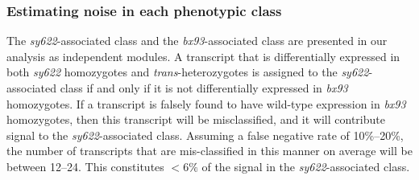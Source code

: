 \documentclass[10pt, twocolumn]{article}
\begin{document}
%
%

\subsubsection*{Estimating noise in each phenotypic class}
The \emph{sy622}-associated class and the \emph{bx93}-associated class are
presented in our analysis as independent modules. A transcript that is
differentially expressed in both \emph{sy622} homozygotes and
\emph{trans}-heterozygotes is assigned to the \emph{sy622}-associated class if
and only if it is not differentially expressed in \emph{bx93} homozygotes. If a
transcript is falsely found to have wild-type expression in \emph{bx93}
homozygotes, then this transcript will be misclassified, and it will contribute
signal to the \emph{sy622}-associated class. Assuming a false negative rate of
10\%--20\%, the number of transcripts that are mis-classified in this manner on
average will be between 12--24. This constitutes $<6\%$ of the signal in the
\emph{sy622}-associated class.
\end{document}
